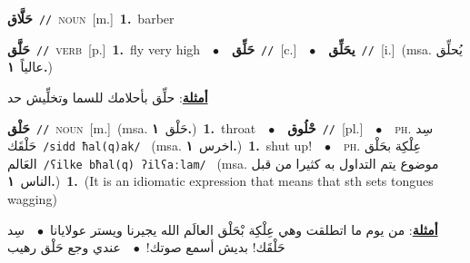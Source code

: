 \documentclass[10pt,a4paper,twoside]{article} %
\begin{document}
\begin{multicols}{2}
{\setlength\topsep{0pt}\textbf{\foreignlanguage{arabic}{حَلَّاق}}\ {\color{gray}\texttt{//}\color{black}}\ \textsc{noun}\ [m.]\ \textbf{1.}~barber\ } \vspace{2mm}

{\setlength\topsep{0pt}\textbf{\foreignlanguage{arabic}{حَلَّق}}\ {\color{gray}\texttt{//}\color{black}}\ \textsc{verb}\ [p.]\ \textbf{1.}~fly very high\ \ $\bullet$\ \ \setlength\topsep{0pt}\textbf{\foreignlanguage{arabic}{حَلِّق}}\ {\color{gray}\texttt{//}\color{black}}\ [c.]\ \ $\bullet$\ \ \setlength\topsep{0pt}\textbf{\foreignlanguage{arabic}{يحَلِّق}}\ {\color{gray}\texttt{//}\color{black}}\ [i.]\ \color{gray}(msa. \foreignlanguage{arabic}{يُحلِّق عالياً}~\foreignlanguage{arabic}{\textbf{١.}})\color{black}\  \begin{flushright}\color{gray}\foreignlanguage{arabic}{\textbf{\underline{\foreignlanguage{arabic}{أمثلة}}}: حلِّق بأحلامك للسما وتخلِّيش حد}\end{flushright}\color{black}} \vspace{2mm}

{\setlength\topsep{0pt}\textbf{\foreignlanguage{arabic}{حَلْق}}\ {\color{gray}\texttt{//}\color{black}}\ \textsc{noun}\ [m.]\ \color{gray}(msa. \foreignlanguage{arabic}{حَلْق}~\foreignlanguage{arabic}{\textbf{١.}})\color{black}\ \textbf{1.}~throat\ \ $\bullet$\ \ \setlength\topsep{0pt}\textbf{\foreignlanguage{arabic}{حْلُوق}}\ {\color{gray}\texttt{//}\color{black}}\ [pl.]\ \ $\bullet$\ \ \textsc{ph.} \color{gray} \foreignlanguage{arabic}{سِد حَلْقَك}\color{black}\ {\color{gray}\texttt{/{\sffamily sidd ħal(q)ak}/}\color{black}}\ \color{gray} (msa. \foreignlanguage{arabic}{اخرس}~\foreignlanguage{arabic}{\textbf{١.}})\color{black}\ \textbf{1.}~shut up!\ \ $\bullet$\ \ \textsc{ph.} \color{gray} \foreignlanguage{arabic}{عِلْكِة بحَلْق العَالم}\color{black}\ {\color{gray}\texttt{/{\sffamily ʕilke bħal(q) ʔilʕaːlam}/}\color{black}}\ \color{gray} (msa. \foreignlanguage{arabic}{موضوع يتم التداول به كثيرا من قبل الناس}~\foreignlanguage{arabic}{\textbf{١.}})\color{black}\ \textbf{1.}~(It is an idiomatic expression that means that sth sets tongues wagging)\  \begin{flushright}\color{gray}\foreignlanguage{arabic}{\textbf{\underline{\foreignlanguage{arabic}{أمثلة}}}: من يوم ما اتطلقت وهي عِلْكِة بْحَلْق العالَم الله يجيرنا ويستر عولايانا\ $\bullet$\ \  سِد حَلْقَك! بديش أسمع صوتك!\ $\bullet$\ \  عندي وجع حَلْق رهيب}\end{flushright}\color{black}} \vspace{2mm}


\end{multicols}
\end{document}
